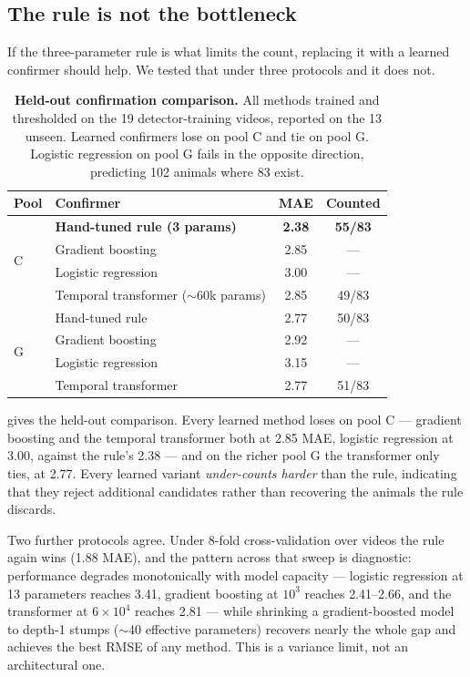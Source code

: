 \subsection{The rule is not the bottleneck}
\label{sec:learned}

If the three-parameter rule is what limits the count, replacing it with a learned confirmer
should help. We tested that under three protocols and it does not.

\begin{table}[t]
\centering\small
\begin{tabular}{llcc}
\toprule
Pool & Confirmer & MAE & Counted \\
\midrule
\multirow{4}{*}{C} & \textbf{Hand-tuned rule (3 params)} & \textbf{2.38} & \textbf{55/83} \\
 & Gradient boosting & 2.85 & --- \\
 & Logistic regression & 3.00 & --- \\
 & Temporal transformer ($\sim$60k params) & 2.85 & 49/83 \\
\midrule
\multirow{4}{*}{G} & Hand-tuned rule & 2.77 & 50/83 \\
 & Gradient boosting & 2.92 & --- \\
 & Logistic regression & 3.15 & --- \\
 & Temporal transformer & 2.77 & 51/83 \\
\bottomrule
\end{tabular}
\caption{\textbf{Held-out confirmation comparison.} All methods trained and thresholded on
the 19 detector-training videos, reported on the 13 unseen. Learned confirmers lose on pool
C and tie on pool G. Logistic regression on pool G fails in the opposite direction,
predicting 102 animals where 83 exist.}
\label{tab:confirmers}
\end{table}

 gives the held-out comparison. Every learned method loses on pool C ---
gradient boosting and the temporal transformer both at 2.85 MAE, logistic regression at
3.00, against the rule's 2.38 --- and on the richer pool G the transformer only ties, at
2.77. Every learned variant \emph{under-counts harder} than the rule, indicating that they
reject additional candidates rather than recovering the animals the rule discards.

Two further protocols agree. Under 8-fold cross-validation over videos the rule again wins
(1.88 MAE), and the pattern across that sweep is diagnostic: performance degrades
monotonically with model capacity --- logistic regression at 13 parameters reaches 3.41,
gradient boosting at $10^3$ reaches 2.41--2.66, and the transformer at $6\times10^4$ reaches
2.81 --- while shrinking a gradient-boosted
model to depth-1 stumps ($\sim$40 effective parameters) recovers nearly the whole gap and
achieves the best RMSE of any method. This is a variance limit, not an architectural one.

